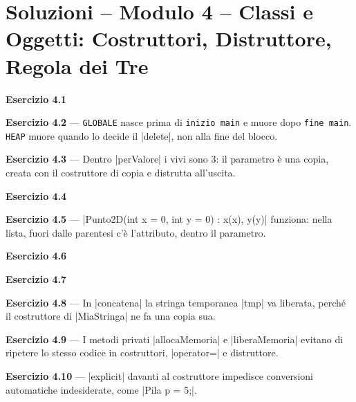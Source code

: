 \chapter{Soluzioni -- Modulo 4 -- Classi e Oggetti: Costruttori, Distruttore, Regola dei Tre}
\textbf{Esercizio 4.1}

\textbf{Esercizio 4.2} --- \texttt{GLOBALE} nasce prima di \texttt{inizio main} e
muore dopo \texttt{fine main}. \texttt{HEAP} muore quando lo decide il \cc|delete|,
non alla fine del blocco.

\textbf{Esercizio 4.3} --- Dentro \cc|perValore| i vivi sono 3: il parametro è una
copia, creata con il costruttore di copia e distrutta all'uscita.

\textbf{Esercizio 4.4}

\textbf{Esercizio 4.5} --- \cc|Punto2D(int x = 0, int y = 0) : x(x), y(y)|
funziona: nella lista, fuori dalle parentesi c'è l'attributo, dentro il parametro.

\textbf{Esercizio 4.6}

\textbf{Esercizio 4.7}

\textbf{Esercizio 4.8} --- In \cc|concatena| la stringa temporanea \cc|tmp| va
liberata, perché il costruttore di \cc|MiaStringa| ne fa una copia sua.

\textbf{Esercizio 4.9} --- I metodi privati \cc|allocaMemoria| e \cc|liberaMemoria|
evitano di ripetere lo stesso codice in costruttori, \cc|operator=| e distruttore.

\textbf{Esercizio 4.10} --- \cc|explicit| davanti al costruttore impedisce
conversioni automatiche indesiderate, come \cc|Pila p = 5;|.
